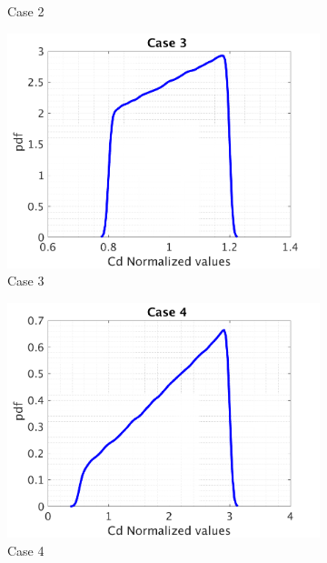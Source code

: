 \documentclass{article}
\begin{document}
\begin{figure}[H]
\begin{center}
\begin{subfigure}{0.4\textwidth}
    \caption{\centering Case 2}
  \end{subfigure}
   \begin{subfigure}{0.4\textwidth}
    \centering\includegraphics[width=1.1\textwidth,keepaspectratio]{images/inverse_problem/infer_drag/case3/cdraw_PDF.png}
    \caption{\centering  Case 3}
  \end{subfigure}
 \begin{subfigure}{0.4\textwidth}
    \centering\includegraphics[width=1.1\textwidth,keepaspectratio]{images/inverse_problem/infer_drag/case4/cdraw_PDF.png}
    \caption{\centering Case 4}
  \end{subfigure}
  \begin{subfigure}{0.4\textwidth}

\end{subfigure}
\end{center}
\end{figure}
\end{document}
